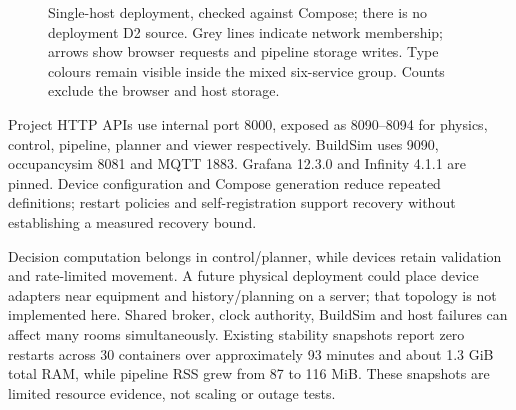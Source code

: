 \documentclass[11pt,a4paper]{article}
\begin{document}
\begin{figure}[H]
\caption{Single-host deployment, checked against Compose; there is no deployment D2 source. Grey lines indicate network membership; arrows show browser requests and pipeline storage writes. Type colours remain visible inside the mixed six-service group. Counts exclude the browser and host storage.}\label{fig:deployment}
\end{figure}
Project HTTP APIs use internal port 8000, exposed as 8090--8094 for physics, control, pipeline, planner and viewer respectively. BuildSim uses 9090, occupancysim 8081 and MQTT 1883. Grafana 12.3.0 and Infinity 4.1.1 are pinned. Device configuration and Compose generation reduce repeated definitions; restart policies and self-registration support recovery without establishing a measured recovery bound.

Decision computation belongs in control/planner, while devices retain validation and rate-limited movement. A future physical deployment could place device adapters near equipment and history/planning on a server; that topology is not implemented here. Shared broker, clock authority, BuildSim and host failures can affect many rooms simultaneously. Existing stability snapshots report zero restarts across 30 containers over approximately 93 minutes and about 1.3 GiB total RAM, while pipeline RSS grew from 87 to 116 MiB. These snapshots are limited resource evidence, not scaling or outage tests.
\end{document}
